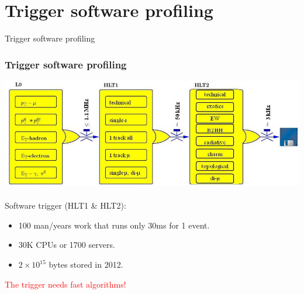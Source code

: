 \documentclass{beamer}
\begin{document}
\section{Trigger software profiling}
\begin{frame}
\begin{exampleblock}{}
  \begin{center}
    {\huge Trigger software profiling}
  \end{center}
\end{exampleblock}

\end{frame}

\begin{frame}
\frametitle{Trigger software profiling}
\includegraphics[width=\textwidth]{images/hlt_struct.png}\\~\\
Software trigger (HLT1 \& HLT2):
\begin{itemize}
  \item 100 man/years work that runs only 30ms for 1 event.
  \item 30K CPUs or 1700 servers.
  \item $2 \times 10^{15}$ bytes stored in 2012.
\end{itemize}
\textcolor{red}{The trigger needs fast algorithms!}
\end{frame}
\end{document}

